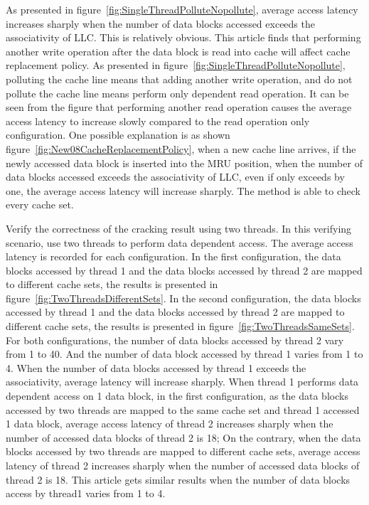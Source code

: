 \documentclass[conference]{IEEEtran}
\begin{document}
As presented in figure~\ref{fig:SingleThreadPolluteNopollute}, average access latency increases sharply when the number of data blocks accessed exceeds the associativity of LLC. This is relatively obvious. This article finds that performing another write operation after the data block is read into cache will affect cache replacement policy. As presented in figure~\ref{fig:SingleThreadPolluteNopollute}, polluting the cache line means that adding another write operation, and do not pollute the cache line means perform only dependent read operation. It can be seen from the figure that performing another read operation causes the average access latency to increase slowly compared to the read operation only configuration. One possible explanation is as shown figure~\ref{fig:New08CacheReplacementPolicy}, when a new cache line arrives, if the newly accessed data block is inserted into the MRU position, when the number of data blocks accessed exceeds the associativity of LLC, even if only exceeds by one, the average access latency will increase sharply. The method is able to check every cache set.


Verify the correctness of the cracking result using two threads. In this verifying scenario, use two threads to perform data dependent access. The average access latency is recorded for each configuration. In the first configuration, the data blocks accessed by thread 1 and the data blocks accessed by thread 2 are mapped to different cache sets, the results is presented in figure~\ref{fig:TwoThreadsDifferentSets}. In the second configuration, the data blocks accessed by thread 1 and the data blocks accessed by thread 2 are mapped to different cache sets, the results is presented in figure~\ref{fig:TwoThreadsSameSets}. For both configurations, the number of data blocks accessed by thread 2 vary from 1 to 40. And the number of data block accessed by thread 1 varies from 1 to 4. When the number of data blocks accessed by thread 1 exceeds the associativity, average latency will increase sharply. When thread 1 performs data dependent access on 1 data block, in the first configuration, as the data blocks accessed by two threads are mapped to the same cache set and thread 1 accessed 1 data block, average access latency of thread 2 increases sharply when the number of accessed data blocks of thread 2 is 18; On the contrary, when the data blocks accessed by two threads are mapped to different cache sets, average access latency of thread 2 increases sharply when the number of accessed data blocks of thread 2 is 18. This article gets similar results when the number of data blocks access by thread1 varies from 1 to 4.
\end{document}
